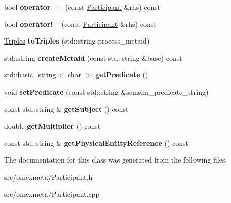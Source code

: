 \begin{DoxyCompactItemize}
\mbox{\label{classomexmeta_1_1Participant_ad3db317039b403fdb7728885152cbeda}} 
bool {\bfseries operator==} (const \hyperlink{classomexmeta_1_1Participant}{Participant} \&rhs) const
\item 
\mbox{\label{classomexmeta_1_1Participant_aa4baa62cb4ccffe8443262382490328d}} 
bool {\bfseries operator!=} (const \hyperlink{classomexmeta_1_1Participant}{Participant} \&rhs) const
\item 
\mbox{\label{classomexmeta_1_1Participant_aefb917ccc60d8652046f5e8abfd44854}} 
\hyperlink{classomexmeta_1_1Triples}{Triples} {\bfseries to\+Triples} (std\+::string process\+\_\+metaid)
\item 
\mbox{\label{classomexmeta_1_1Participant_a6be40a41c69bdd9c48575e3488d1f8c8}} 
std\+::string {\bfseries create\+Metaid} (const std\+::string \&base) const
\item 
\mbox{\label{classomexmeta_1_1Participant_aa09f8c5736dd172b03d7898519d9478d}} 
std\+::basic\+\_\+string$<$ char $>$ {\bfseries get\+Predicate} ()
\item 
\mbox{\label{classomexmeta_1_1Participant_a1188d6a2036514eb6b649ce1e08eca4d}} 
void {\bfseries set\+Predicate} (const std\+::string \&semsim\+\_\+predicate\+\_\+string)
\item 
\mbox{\label{classomexmeta_1_1Participant_a232d2e7fe124ee13650d666fdfc3b866}} 
const std\+::string \& {\bfseries get\+Subject} () const
\item 
\mbox{\label{classomexmeta_1_1Participant_a79b467cfc699483fdfe5e7686cc5447e}} 
double {\bfseries get\+Multiplier} () const
\item 
\mbox{\label{classomexmeta_1_1Participant_a40a5858db6aaae7ec7095b320de838d1}} 
const std\+::string \& {\bfseries get\+Physical\+Entity\+Reference} () const
\end{DoxyCompactItemize}


The documentation for this class was generated from the following files\+:\begin{DoxyCompactItemize}
\item 
src/omexmeta/Participant.\+h\item 
src/omexmeta/Participant.\+cpp\end{DoxyCompactItemize}
